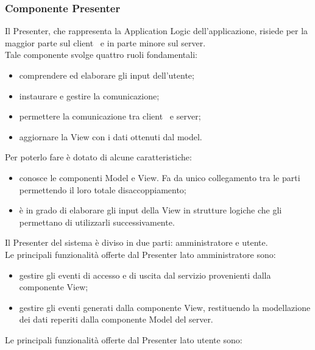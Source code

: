 \subsubsection{Componente Presenter}
\noindent Il Presenter, che rappresenta la Application Logic dell'applicazione, risiede per la maggior parte sul client\g~ e in parte minore sul server\g .\\
Tale componente svolge quattro ruoli fondamentali:
\begin{itemize}
\item comprendere ed elaborare gli input dell'utente;
\item instaurare e gestire la comunicazione;
\item permettere la comunicazione tra client\g~ e server\g ;
\item aggiornare la View con i dati ottenuti dal model.
\end{itemize}
\noindent Per poterlo fare è dotato di alcune caratteristiche:
\begin{itemize}
\item conosce le componenti Model e View. Fa da unico collegamento tra le parti permettendo il loro totale disaccoppiamento;
\item è in grado di elaborare gli input della View in strutture logiche che gli permettano di utilizzarli successivamente.
\end{itemize}
\noindent Il Presenter del sistema è diviso in due parti: amministratore e utente.\\
Le principali funzionalità offerte dal Presenter lato amministratore sono:
\begin{itemize}
\item gestire gli eventi di accesso e di uscita dal servizio provenienti dalla componente View;
\item gestire gli eventi generati dalla componente View, restituendo la modellazione dei dati reperiti dalla componente Model del server.
\end{itemize}
\noindent Le principali funzionalità offerte dal Presenter lato utente sono:
